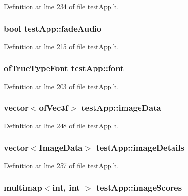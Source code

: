 Definition at line 234 of file test\-App.\-h.

\hypertarget{classtest_app_a918c09b5a4389a8402cfacb25d390226}{
\subsubsection[{fade\-Audio}]{\setlength{\rightskip}{0pt plus 5cm}bool test\-App\-::fade\-Audio}}\label{classtest_app_a918c09b5a4389a8402cfacb25d390226}


Definition at line 215 of file test\-App.\-h.

\hypertarget{classtest_app_a0fdf83c29e178256ee0c1a5b9ee81653}{
\subsubsection[{font}]{\setlength{\rightskip}{0pt plus 5cm}of\-True\-Type\-Font test\-App\-::font}}\label{classtest_app_a0fdf83c29e178256ee0c1a5b9ee81653}


Definition at line 203 of file test\-App.\-h.

\hypertarget{classtest_app_a500cd1228b3364bf30c8fb185e375688}{
\subsubsection[{image\-Data}]{\setlength{\rightskip}{0pt plus 5cm}vector$<$of\-Vec3f$>$ test\-App\-::image\-Data}}\label{classtest_app_a500cd1228b3364bf30c8fb185e375688}


Definition at line 248 of file test\-App.\-h.

\hypertarget{classtest_app_adcd4c3dfc7257326a79e6a3fc8b33406}{
\subsubsection[{image\-Details}]{\setlength{\rightskip}{0pt plus 5cm}vector$<${\bf Image\-Data}$>$ test\-App\-::image\-Details}}\label{classtest_app_adcd4c3dfc7257326a79e6a3fc8b33406}


Definition at line 257 of file test\-App.\-h.

\hypertarget{classtest_app_a9ced1a64554a911109fe8a975b95b590}{
\subsubsection[{image\-Scores}]{\setlength{\rightskip}{0pt plus 5cm}multimap$<$int, int $>$ test\-App\-::image\-Scores}}\label{classtest_app_a9ced1a64554a911109fe8a975b95b590}


